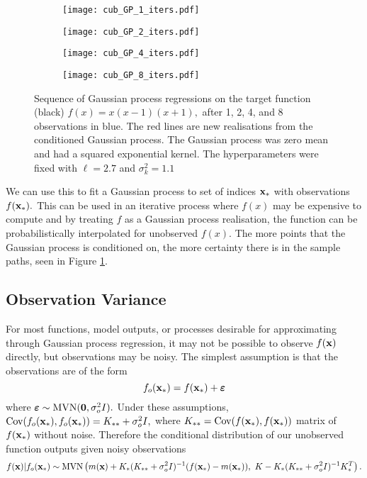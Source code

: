 \begin{figure}[htbp]
    \centering
    \begin{subfigure}[b]{0.5\textwidth}
        \centering
        \texttt{[image: cub\_GP\_1\_iters.pdf]}
    \end{subfigure}%
    \hfill%
    \begin{subfigure}[b]{0.5\textwidth}
        \centering
        \texttt{[image: cub\_GP\_2\_iters.pdf]}
    \end{subfigure}
    \begin{subfigure}[b]{0.5\textwidth}
        \centering
        \texttt{[image: cub\_GP\_4\_iters.pdf]}
    \end{subfigure}%
    \hfill%
    \begin{subfigure}[b]{0.5\textwidth}
        \centering
        \texttt{[image: cub\_GP\_8\_iters.pdf]}
    \end{subfigure}%
    \caption{
        Sequence of Gaussian process regressions on the target function
        (black) $f(x) = x(x-1)(x+1),$ after 1, 2, 4, and 8 observations in
        blue. The red lines are new realisations from the conditioned Gaussian
        process. The Gaussian process was zero mean and had a squared
        exponential kernel. The hyperparameters were fixed with $\ell = 2.7$
        and $\sigma^2_k = 1.1$
    }
    \label{fig:no_var_cub_reg}
\end{figure}

We can use this to fit a Gaussian process to set of indices $\mathbf{x}_*$ with
observations $f(\mathbf{x}_*).$
This can be used in an iterative process where $f(x)$
may be expensive to compute and by treating $f$ as a Gaussian process
realisation, the function can be probabilistically interpolated for unobserved
$f(x).$ The
more points that the Gaussian process is conditioned on, the more certainty
there is in the sample paths, seen in Figure \ref{fig:no_var_cub_reg}.

\subsection*{Observation Variance}

For most functions, model outputs, or processes desirable for
approximating through Gaussian process regression, it may not be possible to
observe $f(\mathbf{x})$ directly, but observations may be noisy.
The simplest assumption is that the
observations are of the form
$$
    f_o(\mathbf{x}_*) = f(\mathbf{x}_*) + \bm{\varepsilon}
$$
where $\bm{\varepsilon} \sim \operatorname{MVN}(\mathbf{0}, \sigma^2_o I).$
Under these assumptions,
$\mathrm{Cov}(f_o(\mathbf{x}_*), f_o(\mathbf{x}_*)) = K_{**} + \sigma^2_o I,$
where $K_{**} = \mathrm{Cov}(f(\mathbf{x}_*), f(\mathbf{x}_*))$
matrix of $f(\mathbf{x}_*)$ without noise. Therefore the conditional
distribution of our unobserved function outputs given noisy observations
$$
    f(\mathbf{x}) | f_o(\mathbf{x}_*)
    \sim \operatorname{MVN}\left(
    m(\mathbf{x}) + K_{*}
    (K_{**} + \sigma^2_o I)^{-1}
    (f(\mathbf{x}_*) - m(\mathbf{x}_*)), \,\,
    K - K_{*}(K_{**} + \sigma^2_o I)^{-1}K_{*}^T
    \right).
$$


